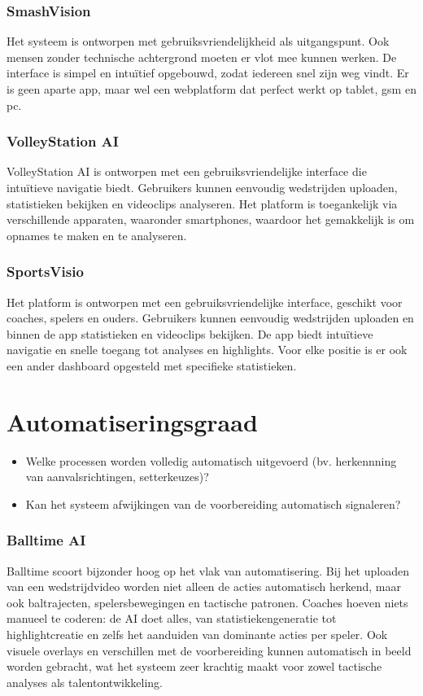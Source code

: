 \subsubsection{SmashVision}
Het systeem is ontworpen met gebruiksvriendelijkheid als uitgangspunt. Ook mensen zonder technische achtergrond moeten er vlot mee kunnen werken. De interface is simpel en intuïtief opgebouwd, zodat iedereen snel zijn weg vindt. Er is geen aparte app, maar wel een webplatform dat perfect werkt op tablet, gsm en pc. \autocite{Doren2025}
\subsubsection{VolleyStation AI}
VolleyStation AI is ontworpen met een gebruiksvriendelijke interface die intuïtieve navigatie biedt. Gebruikers kunnen eenvoudig wedstrijden uploaden, statistieken bekijken en videoclips analyseren. Het platform is toegankelijk via verschillende apparaten, waaronder smartphones, waardoor het gemakkelijk is om opnames te maken en te analyseren. \autocite{VolleyStationAI2025}
\subsubsection{SportsVisio}
Het platform is ontworpen met een gebruiksvriendelijke interface, geschikt voor coaches, spelers en ouders. Gebruikers kunnen eenvoudig wedstrijden uploaden en binnen de app statistieken en videoclips bekijken. De app biedt intuïtieve navigatie en snelle toegang tot analyses en highlights.\autocite{SportsVisio2025} Voor elke positie is er ook een ander dashboard opgesteld met specifieke statistieken. \autocite{Basaranlar2025}

\section{Automatiseringsgraad}
\begin{itemize}
  \item Welke processen worden volledig automatisch uitgevoerd (bv. herkennning van aanvalsrichtingen, setterkeuzes)?
  \item Kan het systeem afwijkingen van de voorbereiding automatisch signaleren?
\end{itemize}
\subsubsection{Balltime AI}
Balltime scoort bijzonder hoog op het vlak van automatisering. Bij het uploaden van een wedstrijdvideo worden niet alleen de acties automatisch herkend, maar ook baltrajecten, spelersbewegingen en tactische patronen. Coaches hoeven niets manueel te coderen: de AI doet alles, van statistiekengeneratie tot highlightcreatie en zelfs het aanduiden van dominante acties per speler. Ook visuele overlays en verschillen met de voorbereiding kunnen automatisch in beeld worden gebracht, wat het systeem zeer krachtig maakt voor zowel tactische analyses als talentontwikkeling. \autocite{BalltimeAI2025}
